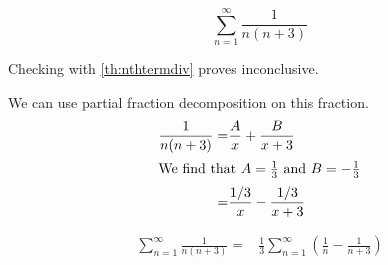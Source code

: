 \begin{ex}
  \[ \sum_{n=1}^\infty \frac{1}{n(n+3)} \]
  \begin{sol}
    Checking with \ref{th:nthtermdiv} proves inconclusive.

    We can use partial fraction decomposition on this fraction.
    \begin{align*}
      \frac{1}{n(n+3)} =& \frac{A}{x}+\frac{B}{x+3} \\
      \intertext{We find that \( A = \frac{1}{3} \) and \(B = -\frac{1}{3} \)}
      =& \frac{1/3}{x}-\frac{1/3}{x+3}
    \end{align*}

    \begin{align*}
      \sum_{n=1}^\infty \frac{1}{n(n+3)} =& \frac{1}{3} \sum_{n=1}^\infty \left(\frac{1}{n}-\frac{1}{n+3}\right)
    \end{align*}
  \end{sol}
\end{ex}
